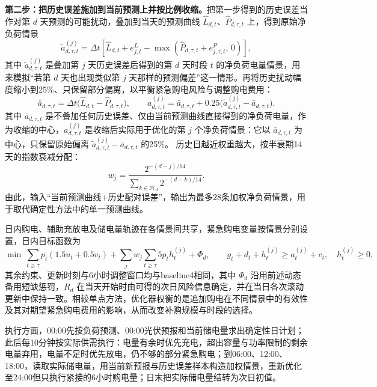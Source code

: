 \textbf{第二步：把历史误差施加到当前预测上并按比例收缩。}把第一步得到的历史误差当作对第 $d$ 天预测的可能扰动，叠加到当天的预测曲线 $\widehat L_{d,t}$、$\widehat P_{d,\tau,t}$ 上，得到原始净负荷情景
\begin{equation}
\widetilde a^{(j)}_{d,\tau,t}=\Delta t\left[\widehat L_{d,t}+e^L_{j,t}-\max\!\left(\widehat P_{d,\tau,t}+e^P_{j,\tau,t},\,0\right)\right],
\end{equation}
其中 $\widetilde a^{(j)}_{d,\tau,t}$ 是叠加第 $j$ 天历史误差后得到的第 $d$ 天时段 $t$ 的净负荷电量情景，用来模拟``若第 $d$ 天也出现类似第 $j$ 天那样的预测偏差''这一情形。再将历史扰动幅度缩小到25\%、只保留部分偏离，以平衡紧急购电风险与调整购电费用：
\begin{equation}
\bar a_{d,\tau,t}=\Delta t\bigl(\widehat L_{d,t}-\widehat P_{d,\tau,t}\bigr),\qquad
a^{(j)}_{d,\tau,t}=\bar a_{d,\tau,t}+0.25\bigl(\widetilde a^{(j)}_{d,\tau,t}-\bar a_{d,\tau,t}\bigr).
\end{equation}
其中 $\bar a_{d,\tau,t}$ 是不叠加任何历史误差、仅由当前预测曲线直接得到的净负荷电量，作为收缩的中心，$a^{(j)}_{d,\tau,t}$ 是收缩后实际用于优化的第 $j$ 个净负荷情景：它以 $\bar a_{d,\tau,t}$ 为中心，只保留原始偏离 $\widetilde a^{(j)}_{d,\tau,t}-\bar a_{d,\tau,t}$ 的25\%。
历史日越近权重越大，按半衰期14天的指数衰减分配：
\begin{equation}
w_j=\frac{2^{-(d-j)/14}}{\sum_{k\in\mathcal H_d}2^{-(d-k)/14}}.
\end{equation}
由此，输入``当前预测曲线+历史配对误差''，输出为最多28条加权净负荷情景，用于取代确定性方法中的单一预测曲线。

日内购电、辅助充放电及储电量轨迹在各情景间共享，紧急购电变量按情景分别设置，日内目标函数为
\begin{equation}
\min\ \sum_{t\ge\tau}p_t(1.5u_t+0.5v_t)+\sum_jw_j\sum_{t\ge\tau}5p_th_t^{(j)}+\Phi_d,
\qquad
g_t+d_t+h_t^{(j)}\ge a_t^{(j)}+c_t,\quad h_t^{(j)}\ge0,
\end{equation}
其余约束、更新时刻与6小时调整窗口均与baseline4相同，其中 $\Phi_d$ 沿用前述动态备用短缺惩罚，$R_d$ 在当天开始时由可得的次日风险信息确定，并在当日各次滚动更新中保持一致。相较单点方法，优化器权衡的是追加购电在不同情景中的有效性及其对期望紧急购电费用的影响，从而改变补购规模与时段的选择。

执行方面，00:00先按负荷预测、00:00光伏预报和当前储电量求出确定性日计划；此后每10分钟按实际供需执行：电量有余时优先充电，超出容量与功率限制的剩余电量弃用，电量不足时优先放电，仍不够的部分紧急购电；到06:00、12:00、18:00，读取实际储电量，用当前新预报与历史误差样本构造加权情景，重新优化至24:00但只执行紧接的6小时购电量；日末把实际储电量结转为次日初值。

